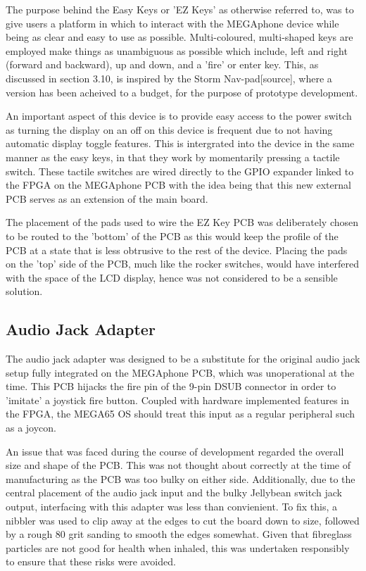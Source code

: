The purpose behind the Easy Keys or 'EZ Keys' as otherwise referred to, was to give users a platform in which to interact with the MEGAphone device while being as clear and easy to use as possible.
Multi-coloured, multi-shaped keys are employed make things as unambiguous as possible which include, left and right (forward and backward), up and down, and a 'fire' or enter key.
This, as discussed in section 3.10, is inspired by the Storm Nav-pad[source], where a version has been acheived to a budget, for the purpose of prototype development. %

An important aspect of this device is to provide easy access to the power switch as turning the display on an off on this device is frequent due to not having automatic display toggle features.
This is intergrated into the device in the same manner as the easy keys, in that they work by momentarily pressing a tactile switch.
These tactile switches are wired directly to the GPIO expander linked to the FPGA on the MEGAphone PCB with the idea being that this new external PCB serves as an extension of the main board.

The placement of the pads used to wire the EZ Key PCB was deliberately chosen to be routed to the 'bottom' of the PCB as this would keep the profile of the PCB at a state that is less obtrusive to the rest of the device.
Placing the pads on the 'top' side of the PCB, much like the rocker switches, would have interfered with the space of the LCD display, hence was not considered to be a sensible solution.

\subsection{Audio Jack Adapter}

The audio jack adapter was designed to be a substitute for the original audio jack setup fully integrated on the MEGAphone PCB, which was unoperational at the time.
This PCB hijacks the fire pin of the 9-pin DSUB connector in order to 'imitate' a joystick fire button. 
Coupled with hardware implemented features in the FPGA, the MEGA65 OS should treat this input as a regular peripheral such as a joycon.

An issue that was faced during the course of development regarded the overall size and shape of the PCB.
This was not thought about correctly at the time of manufacturing as the PCB was too bulky on either side.
Additionally, due to the central placement of the audio jack input and the bulky Jellybean switch jack output, interfacing with this adapter was less than convienient.
To fix this, a nibbler was used to clip away at the edges to cut the board down to size, followed by a rough 80 grit sanding to smooth the edges somewhat.
Given that fibreglass particles are not good for health when inhaled, this was undertaken responsibly to ensure that these risks were avoided.

